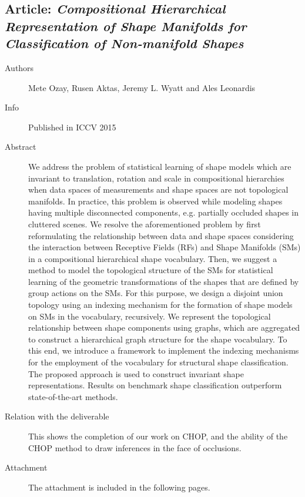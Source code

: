 \documentclass[a4paper,11pt,pdf]{../templates/pacmanreport}
\begin{document}
\subsection{Article: \em Compositional Hierarchical Representation of Shape Manifolds for Classification
of Non-manifold Shapes}
\begin{description}
    \item[Authors] Mete Ozay, Rusen Aktas, Jeremy L. Wyatt and Ales Leonardis
    \item[Info] Published in ICCV 2015 %
    \item[Abstract] We address the problem of statistical learning of shape models which are invariant to translation, rotation and scale in compositional hierarchies when data spaces of measurements and shape spaces are not topological manifolds. In practice, this problem is observed while modeling shapes having multiple disconnected components, e.g.
partially occluded shapes in cluttered scenes. We resolve the aforementioned problem by first reformulating the relationship between data and shape spaces considering the interaction between Receptive Fields (RFs) and Shape Manifolds (SMs) in a compositional hierarchical shape vocabulary. Then, we suggest a method to model the topological
structure of the SMs for statistical learning of the geometric transformations of the shapes that are defined by group
actions on the SMs. For this purpose, we design a disjoint union topology using an indexing mechanism for the formation of shape models on SMs in the vocabulary, recursively. We represent the topological relationship between
shape components using graphs, which are aggregated to construct a hierarchical graph structure for the shape vocabulary. To this end, we introduce a framework to implement the indexing mechanisms for the employment of the vocabulary for structural shape classification. The proposed approach is used to construct invariant shape representations. Results on benchmark shape classification outperform state-of-the-art methods.
\item [Relation with the deliverable] This shows the completion of our work on CHOP, and the ability of the CHOP method to draw inferences in the face of occlusions.
\item[Attachment] The attachment is included in the following pages. %
\end{description}

\newpage
\end{document}
